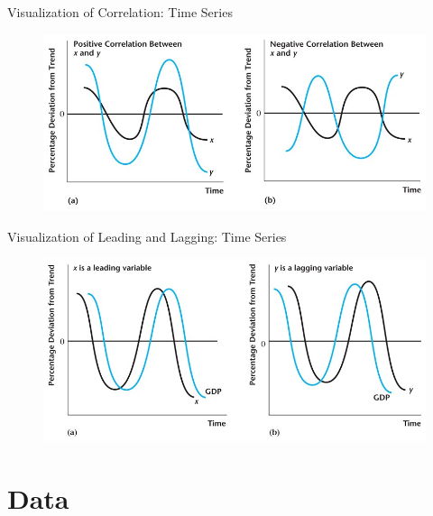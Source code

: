 \documentclass[11pt,aspectratio=43]{beamer}
\theoremstyle{definition}
\begin{document}
\begin{frame}{Visualization of Correlation: Time Series}
\label{slide:Visualization_of_Correlation__Time_Series}
    \begin{figure}
        \includegraphics[width=\textwidth]{./figures/Figure3_3.jpg}
    \end{figure}
\end{frame}

\begin{frame}{Visualization of Leading and Lagging: Time Series}
\label{slide:Visualization_of_Leading_and_Lagging__Time_Series}
    \begin{figure}
        \includegraphics[width=\textwidth]{./figures/Figure3_7.jpg}
    \end{figure}
\end{frame}


\section{Data}
\label{sec:Data}
\end{document}
